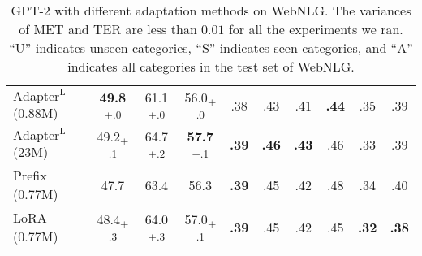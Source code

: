 \begin{table}[h]
\begin{tabular}{l|ccc|ccc|ccc}
$\text{Adapter}^{\text{L}}$ (0.88M)  & \textbf{49.8}\textsubscript{$\pm$.0}  & 61.1\textsubscript{$\pm$.0}           & 56.0\textsubscript{$\pm$.0}           & .38           & .43           & .41           & \textbf{.44}  & .35           &  .39 \\
$\text{Adapter}^{\text{L}}$ (23M)   & 49.2\textsubscript{$\pm$.1}           & 64.7\textsubscript{$\pm$.2}           & \textbf{57.7}\textsubscript{$\pm$.1}  & \textbf{.39}  & \textbf{.46}  & \textbf{.43}  & .46           & .33           &  .39 \\
Prefix (0.77M)                      & 47.7                                  & 63.4                                  & 56.3                                  & \textbf{.39}  & .45           & .42           & .48           & .34           & .40 \\
LoRA (0.77M)                        & 48.4\textsubscript{$\pm$.3}           & 64.0\textsubscript{$\pm$.3}           & 57.0\textsubscript{$\pm$.1}           & \textbf{.39}  & .45           & .42           & .45           & \textbf{.32}  & \textbf{.38} \\
\bottomrule
\end{tabular}
\caption{GPT-2 with different adaptation methods on WebNLG. The variances of MET and TER are less than $0.01$ for all the experiments we ran. ``U'' indicates unseen categories, ``S'' indicates seen categories, and ``A'' indicates all categories in the test set of WebNLG.}
\label{tab:gpt2_ft_webnlg}
\end{table}






